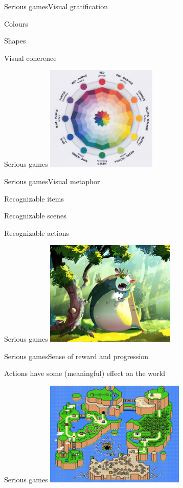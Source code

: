 \documentclass{beamer}
\begin{document}
\begin{slide}{Serious games}{Visual gratification}{
\item Colours
\item Shapes
\item Visual coherence
}\end{slide}

\begin{frame}{Serious games}
\center
\includegraphics[height=5cm]{Pics/color_combinations.png}
\end{frame}

\begin{slide}{Serious games}{Visual metaphor}{
\item Recognizable items
\item Recognizable scenes
\item Recognizable actions
}\end{slide}

\begin{frame}{Serious games}
\center
\includegraphics[height=5cm]{Pics/woods_metaphor.png}
\end{frame}

\begin{slide}{Serious games}{Sense of reward and progression}{
\item Actions have some (meaningful) effect on the world
}\end{slide}

\begin{frame}{Serious games}
\center
\includegraphics[height=5cm]{Pics/mario_world.png}
\end{frame}
\end{document}
